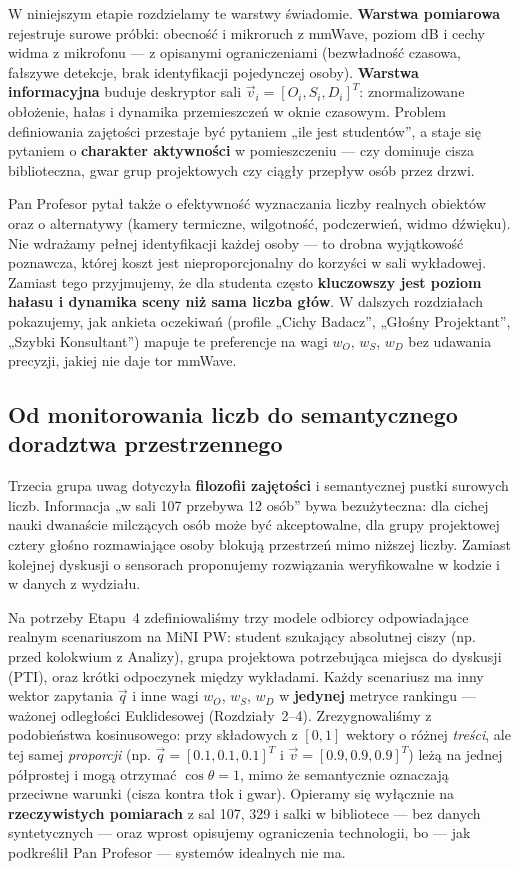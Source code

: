 \documentclass[14pt,a4paper]{extarticle}
\begin{document}
W niniejszym etapie rozdzielamy te warstwy świadomie. \textbf{Warstwa pomiarowa} rejestruje surowe próbki: obecność i mikroruch z mmWave, poziom dB i cechy widma z mikrofonu --- z opisanymi ograniczeniami (bezwładność czasowa, fałszywe detekcje, brak identyfikacji pojedynczej osoby). \textbf{Warstwa informacyjna} buduje deskryptor sali $\vec{v}_i = [O_i, S_i, D_i]^T$: znormalizowane obłożenie, hałas i dynamika przemieszczeń w oknie czasowym. Problem definiowania zajętości przestaje być pytaniem „ile jest studentów”, a staje się pytaniem o \textbf{charakter aktywności} w pomieszczeniu --- czy dominuje cisza biblioteczna, gwar grup projektowych czy ciągły przepływ osób przez drzwi.

Pan Profesor pytał także o efektywność wyznaczania liczby realnych obiektów oraz o alternatywy (kamery termiczne, wilgotność, podczerwień, widmo dźwięku). Nie wdrażamy pełnej identyfikacji każdej osoby --- to drobna wyjątkowość poznawcza, której koszt jest nieproporcjonalny do korzyści w sali wykładowej. Zamiast tego przyjmujemy, że dla studenta często \textbf{kluczowszy jest poziom hałasu i dynamika sceny niż sama liczba głów}. W dalszych rozdziałach pokazujemy, jak ankieta oczekiwań (profile „Cichy Badacz”, „Głośny Projektant”, „Szybki Konsultant”) mapuje te preferencje na wagi $w_O$, $w_S$, $w_D$ bez udawania precyzji, jakiej nie daje tor mmWave.

\subsection{Od monitorowania liczb do semantycznego doradztwa przestrzennego}
Trzecia grupa uwag dotyczyła \textbf{filozofii zajętości} i semantycznej pustki surowych liczb. Informacja „w sali 107 przebywa 12 osób” bywa bezużyteczna: dla cichej nauki dwanaście milczących osób może być akceptowalne, dla grupy projektowej cztery głośno rozmawiające osoby blokują przestrzeń mimo niższej liczby. Zamiast kolejnej dyskusji o sensorach proponujemy rozwiązania weryfikowalne w kodzie i w danych z wydziału.

Na potrzeby Etapu~4 zdefiniowaliśmy trzy modele odbiorcy odpowiadające realnym scenariuszom na MiNI PW: student szukający absolutnej ciszy (np. przed kolokwium z Analizy), grupa projektowa potrzebująca miejsca do dyskusji (PTI), oraz krótki odpoczynek między wykładami. Każdy scenariusz ma inny wektor zapytania $\vec{q}$ i inne wagi $w_O$, $w_S$, $w_D$ w \textbf{jedynej} metryce rankingu --- ważonej odległości Euklidesowej (Rozdziały~2--4). Zrezygnowaliśmy z podobieństwa kosinusowego: przy składowych z $[0,1]$ wektory o różnej \emph{treści}, ale tej samej \emph{proporcji} (np. $\vec{q} = [0.1,0.1,0.1]^T$ i $\vec{v} = [0.9,0.9,0.9]^T$) leżą na jednej półprostej i mogą otrzymać $\cos\theta = 1$, mimo że semantycznie oznaczają przeciwne warunki (cisza kontra tłok i gwar). Opieramy się wyłącznie na \textbf{rzeczywistych pomiarach} z sal 107, 329 i salki w bibliotece --- bez danych syntetycznych --- oraz wprost opisujemy ograniczenia technologii, bo --- jak podkreślił Pan Profesor --- systemów idealnych nie ma.
\end{document}
